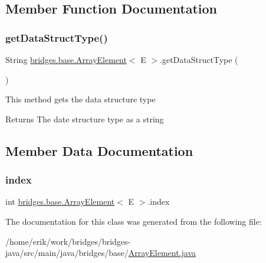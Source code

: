 \subsection{Member Function Documentation}
\mbox{\label{classbridges_1_1base_1_1_array_element_a1d4f3fae7bd986237e364c2cce0bea77}} 
\subsubsection{\texorpdfstring{get\+Data\+Struct\+Type()}{getDataStructType()}}
{\footnotesize\ttfamily String \hyperlink{classbridges_1_1base_1_1_array_element}{bridges.\+base.\+Array\+Element}$<$ E $>$.get\+Data\+Struct\+Type (\begin{DoxyParamCaption}{ }\end{DoxyParamCaption})}

This method gets the data structure type

\begin{DoxyReturn}{Returns}
The date structure type as a string 
\end{DoxyReturn}


\subsection{Member Data Documentation}
\mbox{\label{classbridges_1_1base_1_1_array_element_a79c69e5046da8c297026d1e457a23182}} 
\subsubsection{\texorpdfstring{index}{index}}
{\footnotesize\ttfamily int \hyperlink{classbridges_1_1base_1_1_array_element}{bridges.\+base.\+Array\+Element}$<$ E $>$.index\hspace{0.3cm}{\ttfamily [static]}}



The documentation for this class was generated from the following file\+:\begin{DoxyCompactItemize}
\item 
/home/erik/work/bridges/bridges-\/java/src/main/java/bridges/base/\hyperlink{_array_element_8java}{Array\+Element.\+java}\end{DoxyCompactItemize}
